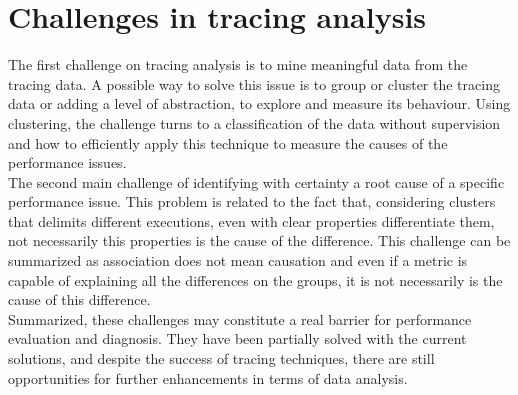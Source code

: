 \section{Challenges in tracing analysis}  %
The first challenge on tracing analysis is to mine meaningful data from the tracing data. A possible way to solve this issue is to group or cluster the tracing data or adding a level of abstraction, to explore and measure its behaviour. Using clustering, the challenge turns to a classification of the data without supervision and how to efficiently apply this technique to measure the causes of the performance issues.\\
The second main challenge of identifying with certainty a root cause of a specific performance issue. This problem is related to the fact that, considering clusters that delimits different executions, even with clear properties differentiate them, not necessarily this properties is the cause of the difference. This challenge can be summarized as association does not mean causation and even if a metric is capable of explaining all the differences on the groups, it is not necessarily is the cause of this difference.\\
Summarized, these challenges may constitute a real barrier for performance evaluation and diagnosis. They have been partially solved with the current solutions, and despite the success of tracing techniques, there are still opportunities for further enhancements in terms of data analysis.

